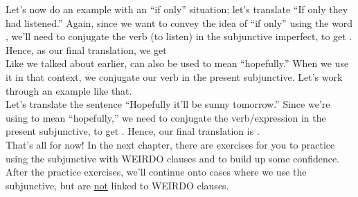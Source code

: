 Let's now do an example with an ``if only'' situation; let's translate ``If only they had listened.'' Again, since we want to convey the idea of ``if only'' using the word , we'll need to conjugate the verb  (to listen) in the subjunctive imperfect, to get . Hence, as our final translation, we get  \\

Like we talked about earlier,  can also be used to mean ``hopefully.'' When we use it in that context, we conjugate our verb in the present subjunctive. Let's work through an example like that. \\

Let's translate the sentence ``Hopefully it'll be sunny tomorrow.'' Since we're using  to mean ``hopefully,'' we need to conjugate the verb/expression  in the present subjunctive, to get . Hence, our final translation is .\\

That's all for now! In the next chapter, there are exercises for you to practice using the subjunctive with WEIRDO clauses and to build up some confidence. After the practice exercises, we'll continue onto cases where we use the subjunctive, but are \underline{not} linked to WEIRDO clauses. 
